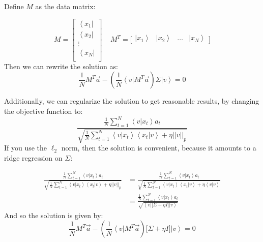 \documentclass[onecolumn,floatfix,nofootinbib,aps,notitlepage]{revtex4-1}
\newcommand{\bra}[1]{\ensuremath{\left\langle#1\right|}}
\newcommand{\ket}[1]{\ensuremath{\left|#1\right\rangle}}
\newcommand{\braket}[2]{\ensuremath{\left\langle#1\right|\left.#2\right\rangle}}
\begin{document}
Define $M$ as the data matrix:

$$ M = \left[ 
\begin{array}{c}
\bra{x_1} \\
\bra{x_2} \\
\vdots \\
\bra{x_N} \\
\end{array} \right] \;\;\;\;
M^T = \Big[ 
\begin{array}{cccc}
\ket{x_1} & \ket{x_2} & \hdots & \ket{x_N} \\
\end{array} \Big]
$$
Then we can rewrite the solution as:
$$ \frac{1}{N} M^T \vec{a} - \left( \frac{1}{N} \bra{v} M^T \vec{a}\right) \Sigma \ket{v} = 0 $$

Additionally, we can regularize the solution to get reasonable results, by changing the objective function to:
$$ \frac{\frac{1}{N}\sum_{t=1}^N \braket{v}{x_t} a_t}
	{\sqrt{\frac{1}{N}\sum_{t=1}^N \braket{v}{x_t}\braket{x_t}{v} + \eta || v ||_p}} $$ If you use the $\ell_2$ norm, then the solution is convenient, because it amounts to a ridge regression on $\Sigma$:

\begin{align*}
\frac{\frac{1}{N}\sum_{t=1}^N \braket{v}{x_t} a_t}
	{\sqrt{\frac{1}{N}\sum_{t=1}^N \braket{v}{x_t}\braket{x_t}{v} + \eta || v ||_p}} &= \frac{\frac{1}{N}\sum_{t=1}^N \braket{v}{x_t} a_t}
	{\sqrt{\frac{1}{N}\sum_{t=1}^N \braket{v}{x_t}\braket{x_t}{v} + \eta \braket{v}{v}}} \\
	&= \frac{\frac{1}{N}\sum_{t=1}^N \braket{v}{x_t} a_t}
	{\sqrt{\bra{v}\Big[\Sigma + \eta I\Big]\ket{v}}} 
\end{align*} And so the solution is given by:
$$ \frac{1}{N} M^T \vec{a} - \left( \frac{1}{N} \bra{v} M^T \vec{a}\right) \big[\Sigma + \eta I\big] \ket{v} = 0 $$
\end{document}

